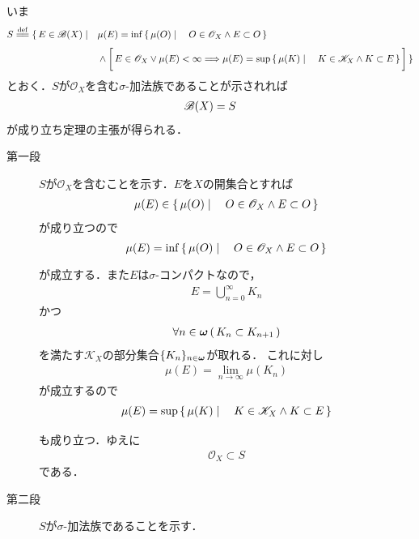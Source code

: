 		\begin{sketch}
			いま
			\begin{align}
				S \defeq \{\, E \in \borel{X} \mid \quad &
				\mu(E) = \inf{}{\Set{\mu(O)}{O \in \mathscr{O}_X \wedge E \subset O}} \\
				&\wedge \left[\, E \in \mathscr{O}_X \vee \mu(E) < \infty 
					\Longrightarrow
					\mu(E) = \sup{}{\Set{\mu(K)}{K \in \mathscr{K}_X \wedge K \subset E}}\, \right]\, \}
			\end{align}
			とおく．$S$が$\mathscr{O}_X$を含む$\sigma$-加法族であることが示されれば
			\begin{align}
				\mathscr{B}(X) = S
			\end{align}
			が成り立ち定理の主張が得られる．
			\begin{description}
				\item[第一段] $S$が$\mathscr{O}_X$を含むことを示す．$E$を$X$の開集合とすれば
					\begin{align}
						\mu(E) \in \left\{\, \mu(O) \mid \quad O \in \mathscr{O}_X \wedge E \subset O\, \right\}
					\end{align}
					が成り立つので
					\begin{align}
						\mu(E) = \operatorname*{inf}_{} \left\{\, \mu(O) \mid \quad O \in \mathscr{O}_X \wedge E \subset O\, \right\}
					\end{align}
					が成立する．また$E$は$\sigma$-コンパクトなので，
					\begin{align}
						E = \bigcup_{n=0}^\infty K_n
					\end{align}
					かつ
					\begin{align}
						\forall n \in {\boldsymbol \omega}\, (\, K_n \subset K_{n+1}\, )
					\end{align}
					を満たす$\mathscr{K}_X$の部分集合$\{K_n\}_{n \in {\boldsymbol \omega}}$が取れる．
					これに対し
					\begin{align}
						\mu(E) = \lim_{n \to \infty} \mu(K_n)
					\end{align}
					が成立するので
					\begin{align}
						\mu(E) = \operatorname*{sup}_{} \left\{\, \mu(K) \mid \quad K \in \mathscr{K}_X \wedge K \subset E\, \right\}
					\end{align}
					も成り立つ．ゆえに
					\begin{align}
						\mathscr{O}_X \subset S
					\end{align}
					である．
					
				\item[第二段] $S$が$\sigma$-加法族であることを示す．
			\end{description}
		\end{sketch}
		
		\begin{screen}
			\begin{thm}[正則正値測度空間のLebesgue拡大も正則正値測度空間]
				
			\end{thm}
		\end{screen}
		